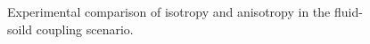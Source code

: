 \documentclass[times,twocolumn,final]{elsarticle}
\begin{document}
\begin{figure}[!t]
    \centering
    \caption{Experimental comparison of isotropy and anisotropy in the fluid-soild coupling scenario.}
    \label{fig:figure5}
\end{figure}
\end{document}
